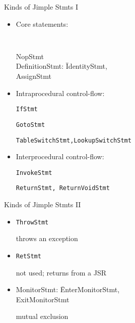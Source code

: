 \begin{slide}{Kinds of Jimple Stmts I}
\vspace*{-0.1in}
\begin{itemize}
\item Core statements:
\vspace*{-0.1in}
{\tt 
\begin{tabbing}
\quad NopStmt \\
\quad DefinitionStmt: \= IdentityStmt, \\
                \>AssignStmt 
\end{tabbing}}

\vspace*{-0.1in}
\item Intraprocedural control-flow:

{\tt \quad IfStmt}

{\tt \quad GotoStmt}

{\tt \quad TableSwitchStmt,LookupSwitchStmt}

\item Interprocedural control-flow:

{\tt \quad InvokeStmt}

{\tt \quad ReturnStmt, ReturnVoidStmt}

\end{itemize}
\end{slide}

\begin{slide}{Kinds of Jimple Stmts II}
\begin{itemize}
\item {\tt ThrowStmt}

\qquad throws an exception

\item {\tt RetStmt}

\qquad not used; returns from a JSR

\item {\tt \begin{tabbing}
MonitorStmt: \= EnterMonitorStmt, \\
                  \> ExitMonitorStmt
\end{tabbing}}

\qquad mutual exclusion
\end{itemize}
\end{slide}


